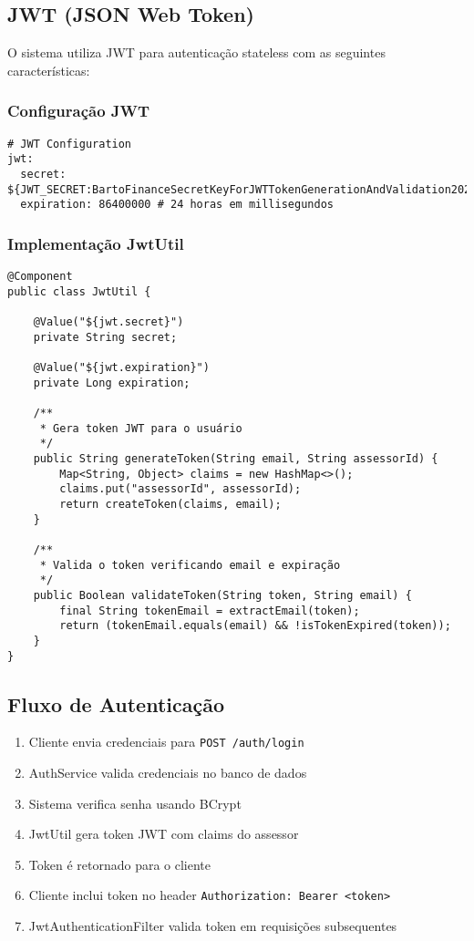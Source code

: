 \documentclass[12pt,a4paper]{article}
\begin{document}
\subsection{JWT (JSON Web Token)}

O sistema utiliza JWT para autenticação stateless com as seguintes características:

\subsubsection{Configuração JWT}

\begin{lstlisting}[caption=Configuração JWT no application.yml]
# JWT Configuration
jwt:
  secret: ${JWT_SECRET:BartoFinanceSecretKeyForJWTTokenGenerationAndValidation2024MustBeAtLeast256BitsLong}
  expiration: 86400000 # 24 horas em millisegundos
\end{lstlisting}

\subsubsection{Implementação JwtUtil}

\begin{lstlisting}[caption=Classe JwtUtil]
@Component
public class JwtUtil {
    
    @Value("${jwt.secret}")
    private String secret;
    
    @Value("${jwt.expiration}")
    private Long expiration;
    
    /**
     * Gera token JWT para o usuário
     */
    public String generateToken(String email, String assessorId) {
        Map<String, Object> claims = new HashMap<>();
        claims.put("assessorId", assessorId);
        return createToken(claims, email);
    }
    
    /**
     * Valida o token verificando email e expiração
     */
    public Boolean validateToken(String token, String email) {
        final String tokenEmail = extractEmail(token);
        return (tokenEmail.equals(email) && !isTokenExpired(token));
    }
}
\end{lstlisting}

\subsection{Fluxo de Autenticação}

\begin{enumerate}
    \item Cliente envia credenciais para \texttt{POST /auth/login}
    \item AuthService valida credenciais no banco de dados
    \item Sistema verifica senha usando BCrypt
    \item JwtUtil gera token JWT com claims do assessor
    \item Token é retornado para o cliente
    \item Cliente inclui token no header \texttt{Authorization: Bearer <token>}
    \item JwtAuthenticationFilter valida token em requisições subsequentes
\end{enumerate}
\end{document}
